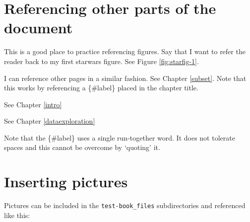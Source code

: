 \documentclass[]{book}
\begin{document}
\hypertarget{referencing-other-parts-of-the-document}{%
\section{Referencing other parts of the document}\label{referencing-other-parts-of-the-document}}

This is a good place to practice referencing figures. Say that I want to refer the reader back to my first starwars figure. See Figure \ref{fig:starfig-1}.

I can reference other pages in a similar fashion. See Chapter \ref{subset}. Note that this works by referencing a \{\#label\} placed in the chapter title.

See Chapter \ref{intro}

See Chapter \ref{dataexploration}

Note that the \{\#label\} uses a single run-together word. It does not tolerate spaces and this cannot be overcome by `quoting' it.

\hypertarget{inserting-pictures}{%
\section{Inserting pictures}\label{inserting-pictures}}

Pictures can be included in the \texttt{test-book\_files} subdirectories and referenced like this:
\end{document}
